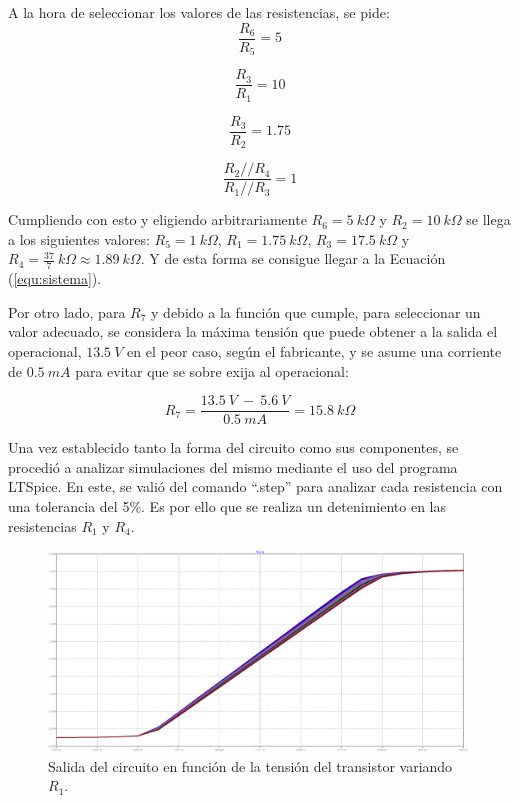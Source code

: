 \documentclass[a4paper]{article}
\begin{document}
A la hora de seleccionar los valores de las resistencias, se pide:
\begin{equation}
	\frac{R_6}{R_5} = 5
	\label{equ:condm1-1}
\end{equation}

\begin{equation}
	\frac{R_3}{R_1} = 10
	\label{equ:condm1-2}
\end{equation}

\begin{equation}
	\frac{R_3}{R_2} = 1.75
	\label{equ:condm1-3}
\end{equation}

\begin{equation}
	\frac{R_2 // R_4}{R_1 // R_3} = 1
	\label{equ:condm1-4}
\end{equation}

Cumpliendo con esto y eligiendo arbitrariamente $R_6 = 5 \ k\Omega$ y $R_2 = 10 \ k\Omega$ se llega a los siguientes valores: $R_5 = 1 \ k\Omega$, $R_1 = 1.75 \ k\Omega$, $R_3 = 17.5 \ k\Omega$ y $R_4 = \frac{37}{7} \ k\Omega \approx 1.89 \ k\Omega$. Y de esta forma se consigue llegar a la Ecuación (\ref{equ:sistema}).

Por otro lado, para $R_7$ y debido a la función que cumple, para seleccionar un valor adecuado, se considera la máxima tensión que puede obtener a la salida el operacional, $13.5 \ V$ en el peor caso, según el fabricante, y se asume una corriente de $0.5 \ mA$ para evitar que se sobre exija al operacional:

\begin{equation}
	R_7 = \frac{13.5 \ V \ - \ 5.6 \ V}{0.5 \ mA} = 15.8 \ k\Omega
	\label{equ:condm1-5}
\end{equation}

Una vez establecido tanto la forma del circuito como sus componentes, se procedió a analizar simulaciones del mismo mediante el uso del programa LTSpice. En este, se valió del comando ``.step'' para analizar cada resistencia con una tolerancia del 5\%. Es por ello que se realiza un detenimiento en las resistencias $R_1$ y $R_4$.

\begin{figure}[H]
	\centering
	\includegraphics[width=0.99\textwidth]{Ejercicio6/Imagenes/StepR1-M1.png}
	\caption{Salida del circuito en función de la tensión del transistor variando $R_1$.}
	\label{fig:r1-M1}
\end{figure}
\end{document}
